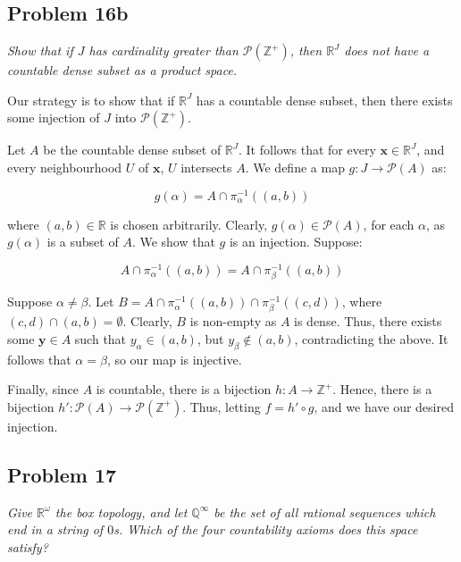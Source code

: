 \documentclass[10pt, oneside]{amsart}
\newcommand{\bm}{\boldsymbol}
\begin{document}
    \hrulefill

    \subsection{Problem 16b} \textit{Show that if $J$ has cardinality greater than $\mathcal{P}(\mathbb{Z}^{+})$, then $\mathbb{R}^{J}$ does not have a
      countable dense subset as a product space.}
    \newline

    Our strategy is to show that if $\mathbb{R}^{J}$ has a countable dense subset, then there exists some injection of $J$ into $\mathcal{P}(\mathbb{Z}^{+})$.
    \newline

    Let $A$ be the countable dense subset of $\mathbb{R}^{J}$. It follows that for every $\bm{x} \in \mathbb{R}^{J}$, and every neighbourhood $U$ of $\bm{x}$,
    $U$ intersects $A$. We define a map $g : J \rightarrow \mathcal{P}(A)$ as:

    $$g(\alpha) = A \cap \pi^{-1}_{\alpha}((a, b))$$

    where $(a, b) \in \mathbb{R}$ is chosen arbitrarily. Clearly, $g(\alpha) \in \mathcal{P}(A)$, for each $\alpha$, as $g(\alpha)$ is a subset of $A$. We show
    that $g$ is an injection. Suppose:

    $$A \cap \pi^{-1}_{\alpha}((a, b)) = A \cap \pi^{-1}_{\beta}((a, b))$$

    Suppose $\alpha \neq \beta$. Let $B = A \cap \pi^{-1}_{\alpha}((a, b)) \cap \pi^{-1}_{\beta}((c, d))$, where $(c, d) \cap (a, b) = \emptyset$. Clearly, $B$ is non-empty as $A$ is dense. Thus,
    there exists some $\bm{y} \in A$ such that $y_{\alpha} \in (a, b)$, but $y_{\beta} \notin (a, b)$, contradicting the above. It follows that $\alpha = \beta$, so our map is injective.
    \newline

    Finally, since $A$ is countable, there is a bijection $h : A \rightarrow \mathbb{Z}^{+}$. Hence, there is a bijection $h' : \mathcal{P}(A) \rightarrow \mathcal{P}(\mathbb{Z}^{+})$.
    Thus, letting $f = h' \circ g$, and we have our desired injection.

    \hrulefill

    \subsection{Problem 17} \textit{Give $\mathbb{R}^{\omega}$ the box topology, and let $\mathbb{Q}^{\infty}$ be the set of all rational sequences which end in a string of $0$s. Which of the
      four countability axioms does this space satisfy?}
    \newline
\end{document}
